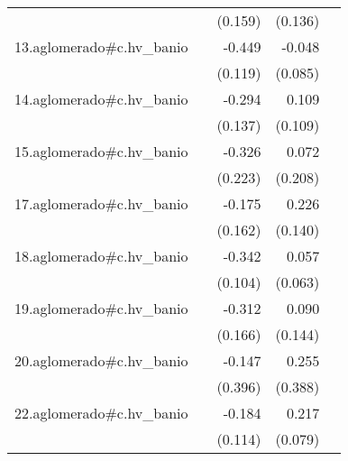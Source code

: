{\begin{longtable}{l*{4}{D{.}{.}{-1}}}
            &                     &     (0.159)         &     (0.136)         &                     \\
\addlinespace
13.aglomerado#c.hv\_banio&                     &      -0.449\sym{***}&      -0.048         &                     \\
            &                     &     (0.119)         &     (0.085)         &                     \\
\addlinespace
14.aglomerado#c.hv\_banio&                     &      -0.294\sym{*}  &       0.109         &                     \\
            &                     &     (0.137)         &     (0.109)         &                     \\
\addlinespace
15.aglomerado#c.hv\_banio&                     &      -0.326         &       0.072         &                     \\
            &                     &     (0.223)         &     (0.208)         &                     \\
\addlinespace
17.aglomerado#c.hv\_banio&                     &      -0.175         &       0.226         &                     \\
            &                     &     (0.162)         &     (0.140)         &                     \\
\addlinespace
18.aglomerado#c.hv\_banio&                     &      -0.342\sym{***}&       0.057         &                     \\
            &                     &     (0.104)         &     (0.063)         &                     \\
\addlinespace
19.aglomerado#c.hv\_banio&                     &      -0.312         &       0.090         &                     \\
            &                     &     (0.166)         &     (0.144)         &                     \\
\addlinespace
20.aglomerado#c.hv\_banio&                     &      -0.147         &       0.255         &                     \\
            &                     &     (0.396)         &     (0.388)         &                     \\
\addlinespace
22.aglomerado#c.hv\_banio&                     &      -0.184         &       0.217\sym{**} &                     \\
            &                     &     (0.114)         &     (0.079)         &                     \\

\end{longtable}}
